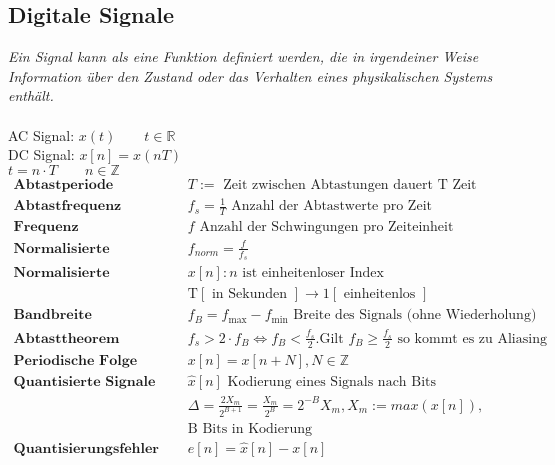 \documentclass[8pt]{article}
\begin{document}
		\subsection{Digitale Signale}
		\textit{Ein Signal kann als eine Funktion definiert werden,
die in irgendeiner Weise Information \"uber den Zustand
oder das Verhalten eines physikalischen Systems enth\"alt.}\\\\
		AC Signal: $x(t) \qquad t \in \mathbb{R}$\\
		DC Signal: $x[n] = x(nT)$\\
		$t = n \cdot T \qquad n \in \mathbb{Z}$\\
		\begin{align*}
			\textbf{Abtastperiode } & T := \text{ Zeit zwischen Abtastungen dauert T Zeit}\\
			\textbf{Abtastfrequenz } & f_s = \frac{1}{T} \text{ Anzahl der Abtastwerte pro Zeit}\\
			\textbf{Frequenz } & f \text{ Anzahl der Schwingungen pro Zeiteinheit}\\
			\textbf{Normalisierte Frequenz } & f_{norm} = \frac{f}{f_s}\\
			\textbf{Normalisierte Darstellung } & x[n]: n \text{ ist einheitenloser Index}\\
			& \text{T} [\text{ in Sekunden }] \rightarrow 1 [\text{ einheitenlos }]\\
			\textbf{Bandbreite } & f_B = f_\text{max} - f_\text{min}  \text{ Breite des Signals (ohne Wiederholung)}\\
			\textbf{Abtasttheorem } & f_s > 2 \cdot f_B \Leftrightarrow f_B < \frac{f_s}{2}. \text{Gilt } f_B \geq \frac{f_s}{2} \text{ so kommt es zu Aliasing}\\
			\textbf{Periodische Folge } & x[n] = x[n + N], N \in \mathbb{Z}\\
			\textbf{Quantisierte Signale } & \hat{x}[n] \text{ Kodierung eines Signals nach Bits}\\
			& \Delta = \frac{2X_m}{2^{B+1}} = \frac{X_m}{2^B} = 2^{-B}X_m, X_m:= max(x[n]),\\
			& \text{B Bits in Kodierung}\\
			\textbf{Quantisierungsfehler } & e[n] = \hat{x}[n] - x[n]\\
		\end{align*}
\end{document}
